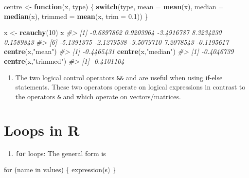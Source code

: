 \documentclass[
]{book}
\newenvironment{Shaded}{\begin{snugshade}}{\end{snugshade}}
\newcommand{\AttributeTok}[1]{\textcolor[rgb]{0.13,0.29,0.53}{#1}}
\newcommand{\CommentTok}[1]{\textcolor[rgb]{0.56,0.35,0.01}{\textit{#1}}}
\newcommand{\ControlFlowTok}[1]{\textcolor[rgb]{0.13,0.29,0.53}{\textbf{#1}}}
\newcommand{\DecValTok}[1]{\textcolor[rgb]{0.00,0.00,0.81}{#1}}
\newcommand{\FloatTok}[1]{\textcolor[rgb]{0.00,0.00,0.81}{#1}}
\newcommand{\FunctionTok}[1]{\textcolor[rgb]{0.13,0.29,0.53}{\textbf{#1}}}
\newcommand{\NormalTok}[1]{#1}
\newcommand{\OtherTok}[1]{\textcolor[rgb]{0.56,0.35,0.01}{#1}}
\newcommand{\StringTok}[1]{\textcolor[rgb]{0.31,0.60,0.02}{#1}}
\providecommand{\tightlist}{%
  \setlength{\itemsep}{0pt}\setlength{\parskip}{0pt}}
\begin{document}
\begin{Shaded}
\begin{Highlighting}[]
\NormalTok{centre }\OtherTok{\textless{}{-}} \ControlFlowTok{function}\NormalTok{(x, type) }
\NormalTok{  \{ }\ControlFlowTok{switch}\NormalTok{(type,}
           \AttributeTok{mean =} \FunctionTok{mean}\NormalTok{(x),}
           \AttributeTok{median =} \FunctionTok{median}\NormalTok{(x),}
           \AttributeTok{trimmed =} \FunctionTok{mean}\NormalTok{(x, }\AttributeTok{trim =} \FloatTok{0.1}\NormalTok{))}
\NormalTok{  \}}

\NormalTok{x }\OtherTok{\textless{}{-}} \FunctionTok{rcauchy}\NormalTok{(}\DecValTok{10}\NormalTok{)}
\NormalTok{x}
\CommentTok{\#\textgreater{}  [1] {-}0.6897862  0.9203964 {-}3.4916787  8.3234230  0.1589843}
\CommentTok{\#\textgreater{}  [6] {-}5.1391375 {-}2.1279538 {-}9.5079710  7.2078543 {-}0.1195617}
\FunctionTok{centre}\NormalTok{(x,}\StringTok{"mean"}\NormalTok{)}
\CommentTok{\#\textgreater{} [1] {-}0.4465431}
\FunctionTok{centre}\NormalTok{(x,}\StringTok{"median"}\NormalTok{)}
\CommentTok{\#\textgreater{} [1] {-}0.4046739}
\FunctionTok{centre}\NormalTok{(x,}\StringTok{"trimmed"}\NormalTok{)}
\CommentTok{\#\textgreater{} [1] {-}0.4101104}
\end{Highlighting}
\end{Shaded}

\begin{enumerate}
\def\labelenumi{(\alph{enumi})}
\setcounter{enumi}{7}
\tightlist
\item
  The two logical control operators \texttt{\&\&} and \texttt{\textbar{}\textbar{}} are useful when using if-else statements. These two operators operate on logical expressions in contrast to the operators \texttt{\&} and \texttt{\textbar{}} which operate on vectors/matrices.
\end{enumerate}

\section{Loops in R}\label{loops-in-r}

\begin{enumerate}
\def\labelenumi{(\alph{enumi})}
\tightlist
\item
  \texttt{for} loops: The general form is
\end{enumerate}

\begin{Shaded}
\begin{Highlighting}[]
\NormalTok{for (name in values)}
\NormalTok{      \{ expression(s)}
\NormalTok{      \}}
\end{Highlighting}
\end{Shaded}
\end{document}
